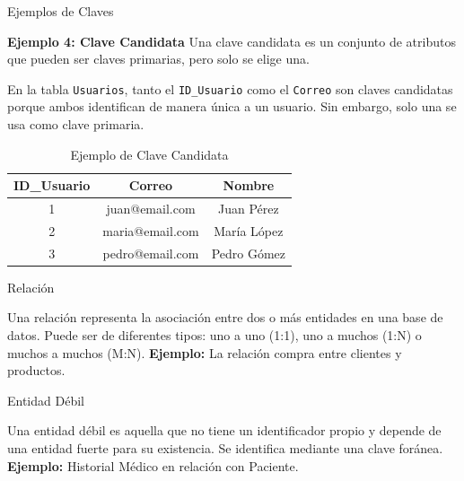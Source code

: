 \documentclass[spanish]{beamer}
\begin{document}
\begin{frame}{Ejemplos de Claves}
    \begin{tcolorbox}[title=Ejemplos de Claves,colback=gray!5!white,colframe=gray!75!black]
        

        \textbf{Ejemplo 4: Clave Candidata}  
        Una clave candidata es un conjunto de atributos que pueden ser claves primarias, pero solo se elige una.  

        En la tabla \texttt{Usuarios}, tanto el \texttt{ID\_Usuario} como el \texttt{Correo} son claves candidatas porque ambos identifican de manera única a un usuario. Sin embargo, solo una se usa como clave primaria.

        \begin{table}[]
            \centering
            \begin{tabular}{|c|c|c|}
                \hline
                \textbf{ID\_Usuario} & \textbf{Correo} & \textbf{Nombre}  \\
                \hline
                1           & juan@email.com    & Juan Pérez  \\
                2           & maria@email.com   & María López \\
                3           & pedro@email.com   & Pedro Gómez \\
                \hline
            \end{tabular}
            \caption{Ejemplo de Clave Candidata}
        \end{table}
    \end{tcolorbox}
\end{frame}

\begin{frame}{Relación}
    \begin{tcolorbox}[title=Relación,colback=red!5!white,colframe=red!75!black]
        Una relación representa la asociación entre dos o más entidades en una base de datos. 
        Puede ser de diferentes tipos: uno a uno (1:1), uno a muchos (1:N) o muchos a muchos (M:N).
        \textbf{Ejemplo:} La relación compra entre clientes y productos.
    \end{tcolorbox}
\end{frame}

\begin{frame}{Entidad Débil}
    \begin{tcolorbox}[title=Entidad Débil,colback=purple!5!white,colframe=purple!75!black]
        Una entidad débil es aquella que no tiene un identificador propio y depende de una entidad fuerte para su existencia. 
        Se identifica mediante una clave foránea.
        \textbf{Ejemplo:} Historial Médico en relación con Paciente.
    \end{tcolorbox}
\end{frame}
\end{document}
